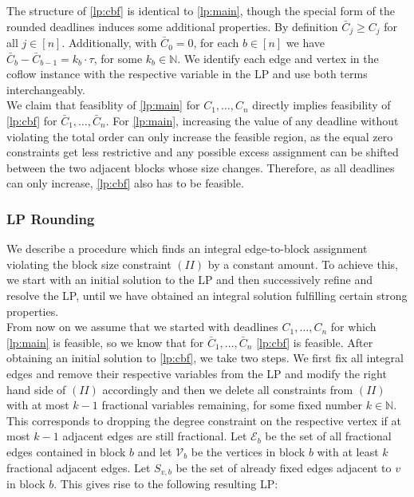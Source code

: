 \documentclass[11pt]{article}
\begin{document}
The structure of \ref{lp:cbf} is identical to \ref{lp:main}, though the special form of the rounded deadlines induces some additional properties. By definition $\bar{C}_j \ge C_j$ for all $j \in [n]$. Additionally, with $\bar{C}_0 = 0$, for each $b \in [n]$ we have $\bar{C}_b - \bar{C}_{b-1} = k_b \cdot  \tau$, for some $k_b \in \mathbb{N}$.
We identify each edge and vertex in the coflow instance with the respective variable in the LP and use both terms interchangeably.\\

We claim that feasiblity of  \ref{lp:main} for $C_1,\dotsc,C_n$ directly implies feasibility of \ref{lp:cbf} for $\bar{C}_1,\dotsc,\bar{C}_n$. For \ref{lp:main}, increasing the value of any deadline without violating the total order can only increase the feasible region, as the equal zero constraints get less restrictive and any possible excess assignment can be shifted between the two adjacent blocks whose size changes. Therefore, as all deadlines can only increase, \ref{lp:cbf} also has to be feasible.

\subsubsection*{LP Rounding}
We describe a procedure which finds an integral edge-to-block assignment violating the block size constraint $(II)$ by a constant amount. To achieve this, we start with an initial solution to the LP and then successively refine and resolve the LP, until we have obtained an integral solution fulfilling certain strong properties.\\

From now on we assume that we started with deadlines $C_1,\dotsc,C_n$ for which \ref{lp:main} is feasible, so we know that for $\bar{C}_1,\dotsc,\bar{C}_n$ \ref{lp:cbf} is feasible. After obtaining an initial solution to \ref{lp:cbf}, we take two steps. We first fix all integral edges and remove their respective variables from the LP and modify the right hand side of $(II)$ accordingly and then we delete all constraints from $(II)$ with at most $k-1$ fractional variables remaining, for some fixed number $k \in \mathbb{N}$. This corresponds to dropping the degree constraint on the respective vertex if at most $k-1$ adjacent edges are still fractional. Let $\mathcal{E}_{b}$ be the set of all fractional edges contained in block $b$ and let $\mathcal{V}_{b}$ be the vertices in block $b$ with at least $k$ fractional adjacent edges. Let $S_{v,b}$ be the set of already fixed edges adjacent to $v$ in block $b$.
This gives rise to the following resulting LP:
\end{document}

